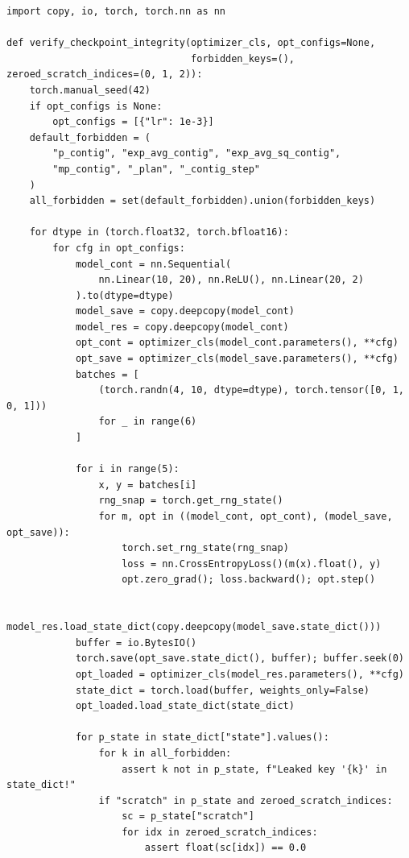 \documentclass[11pt,a4paper]{article}
\renewcommand{\_}{\origunderscore\allowbreak}
\begin{document}
\begin{lstlisting}[caption={Standard LSO-Eval Stage II: Checkpoint Roundtrip \& State Cleanup Test (v1.1.1)}, label={lst:checkpoint_test}]
import copy, io, torch, torch.nn as nn

def verify_checkpoint_integrity(optimizer_cls, opt_configs=None,
                                forbidden_keys=(), zeroed_scratch_indices=(0, 1, 2)):
    torch.manual_seed(42)
    if opt_configs is None:
        opt_configs = [{"lr": 1e-3}]
    default_forbidden = (
        "p_contig", "exp_avg_contig", "exp_avg_sq_contig",
        "mp_contig", "_plan", "_contig_step"
    )
    all_forbidden = set(default_forbidden).union(forbidden_keys)

    for dtype in (torch.float32, torch.bfloat16):
        for cfg in opt_configs:
            model_cont = nn.Sequential(
                nn.Linear(10, 20), nn.ReLU(), nn.Linear(20, 2)
            ).to(dtype=dtype)
            model_save = copy.deepcopy(model_cont)
            model_res = copy.deepcopy(model_cont)
            opt_cont = optimizer_cls(model_cont.parameters(), **cfg)
            opt_save = optimizer_cls(model_save.parameters(), **cfg)
            batches = [
                (torch.randn(4, 10, dtype=dtype), torch.tensor([0, 1, 0, 1]))
                for _ in range(6)
            ]

            for i in range(5):
                x, y = batches[i]
                rng_snap = torch.get_rng_state()
                for m, opt in ((model_cont, opt_cont), (model_save, opt_save)):
                    torch.set_rng_state(rng_snap)
                    loss = nn.CrossEntropyLoss()(m(x).float(), y)
                    opt.zero_grad(); loss.backward(); opt.step()

            model_res.load_state_dict(copy.deepcopy(model_save.state_dict()))
            buffer = io.BytesIO()
            torch.save(opt_save.state_dict(), buffer); buffer.seek(0)
            opt_loaded = optimizer_cls(model_res.parameters(), **cfg)
            state_dict = torch.load(buffer, weights_only=False)
            opt_loaded.load_state_dict(state_dict)

            for p_state in state_dict["state"].values():
                for k in all_forbidden:
                    assert k not in p_state, f"Leaked key '{k}' in state_dict!"
                if "scratch" in p_state and zeroed_scratch_indices:
                    sc = p_state["scratch"]
                    for idx in zeroed_scratch_indices:
                        assert float(sc[idx]) == 0.0


\end{lstlisting}
\end{document}

